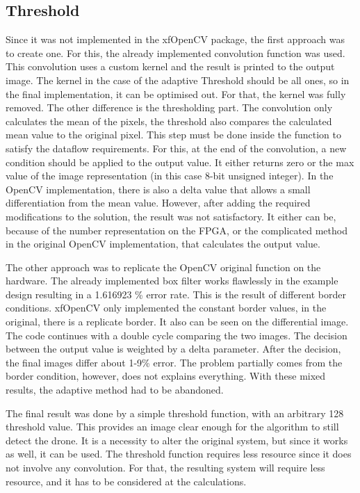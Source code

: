 \subsection{Threshold} %
Since it was not implemented in the xfOpenCV package, the first approach was to create one.
For this, the already implemented convolution function was used.
This convolution uses a custom kernel and the result is printed to the output image.
The kernel in the case of the adaptive Threshold should be all ones, so in the final implementation, it can be optimised out.
For that, the kernel was fully removed.
The other difference is the thresholding part.
The convolution only calculates the mean of the pixels, the threshold also compares the calculated mean value to the original pixel.
This step must be done inside the function to satisfy the dataflow requirements.
For this, at the end of the convolution, a new condition should be applied to the output value.
It either returns zero or the max value of the image representation (in this case 8-bit unsigned integer).
In the OpenCV implementation, there is also a delta value that allows a small differentiation from the mean value.
However, after adding the required modifications to the solution, the result was not satisfactory.
It either can be, because of the number representation on the FPGA, or the complicated method in the original OpenCV implementation, that calculates the output value.

The other approach was to replicate the OpenCV original function on the hardware.
The already implemented box filter works flawlessly in the example design resulting in a 1.616923 \% error rate.
This is the result of different border conditions.
xfOpenCV only implemented the constant border values, in the original, there is a replicate border.
It also can be seen on the differential image.
The code continues with a double cycle comparing the two images.
The decision between the output value is weighted by a delta parameter.
After the decision, the final images differ about 1-9\% error.
The problem partially comes from the border condition, however, does not explains everything.
With these mixed results, the adaptive method had to be abandoned.

The final result was done by a simple threshold function, with an arbitrary 128 threshold value.
This provides an image clear enough for the algorithm to still detect the drone.
It is a necessity to alter the original system, but since it works as well, it can be used.
The threshold function requires less resource since it does not involve any convolution.
For that, the resulting system will require less resource, and it has to be considered at the calculations.

